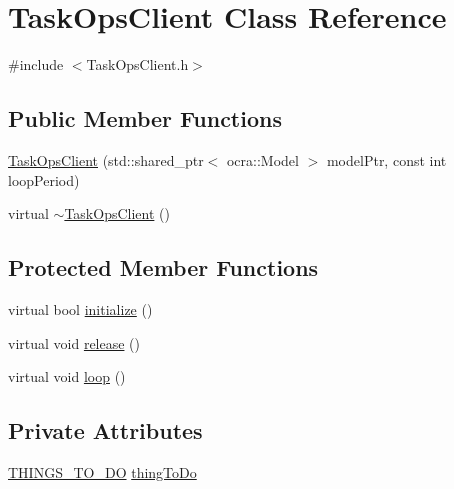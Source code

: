 \hypertarget{classTaskOpsClient}{\section{\-Task\-Ops\-Client \-Class \-Reference}
\label{classTaskOpsClient}
}


{\ttfamily \#include $<$\-Task\-Ops\-Client.\-h$>$}

\subsection*{\-Public \-Member \-Functions}
\begin{DoxyCompactItemize}
\item 
\hyperlink{classTaskOpsClient_a6d3842de3255a78526ced7953428452c}{\-Task\-Ops\-Client} (std\-::shared\-\_\-ptr$<$ ocra\-::\-Model $>$ model\-Ptr, const int loop\-Period)
\item 
virtual \hyperlink{classTaskOpsClient_a80a5c71dd04ab7a07d4ffb8116244cdd}{$\sim$\-Task\-Ops\-Client} ()
\end{DoxyCompactItemize}
\subsection*{\-Protected \-Member \-Functions}
\begin{DoxyCompactItemize}
\item 
virtual bool \hyperlink{classTaskOpsClient_a6f5e4c20c1d5f5df28dcc58e3cb4adb0}{initialize} ()
\item 
virtual void \hyperlink{classTaskOpsClient_af54d37bc4a2631c5c47e23d8156f6e95}{release} ()
\item 
virtual void \hyperlink{classTaskOpsClient_a7e7dfab7af0404f0b008da2844ab573e}{loop} ()
\end{DoxyCompactItemize}
\subsection*{\-Private \-Attributes}
\begin{DoxyCompactItemize}
\item 
\hyperlink{TaskOpsClient_8h_a0140057ae3fbe1db5f5c418dfc67d9db}{\-T\-H\-I\-N\-G\-S\-\_\-\-T\-O\-\_\-\-D\-O} \hyperlink{classTaskOpsClient_a3409c4ef6b396943397b5bd9237f0a40}{thing\-To\-Do}
\end{DoxyCompactItemize}


